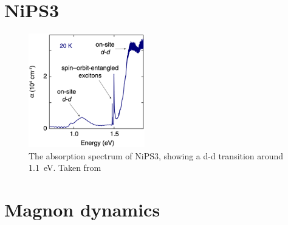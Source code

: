 \section{NiPS3}
\begin{figure}[ht]
    \centering
    \includegraphics[width=0.45\textwidth]{pictures/8.png}
    \caption{The absorption spectrum of NiPS3, showing a d-d transition around \qty{1.1}{eV}. Taken from }
    \label{fig:8}
\end{figure}
\FloatBarrier


\section{Magnon dynamics} 

